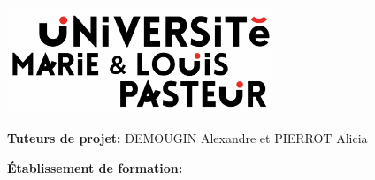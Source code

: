 \makeatletter
\begin{titlepage}
  \enlargethispage{3cm}


  \begin{center}	
    \vspace*{4cm}
    \textsc{\@title} \\
    \vspace*{0,5cm} 
    \HRule%
    \vspace*{0,5cm}
    \large{\@author} \\ 
    \vspace*{0.2cm}
    \anneeUniversitaire\\
    \vspace*{1cm}
    \includegraphics[width=8cm]{assets/pictures/logo_ufc.png}
  \end{center}

  \vspace*{1cm}
  \noindent
  \large{\textbf{Tuteurs de projet:} \textsc{DEMOUGIN} Alexandre  et \textsc{PIERROT} Alicia}\\
  \vspace*{0.5cm}
  
  \noindent
  \large{\textbf{Établissement de formation:} \textsc{\univ}}\\

\end{titlepage}
\ClearShipoutPicture
\thispagestyle{empty}
\setcounter{page}{0}
\null
\newpage